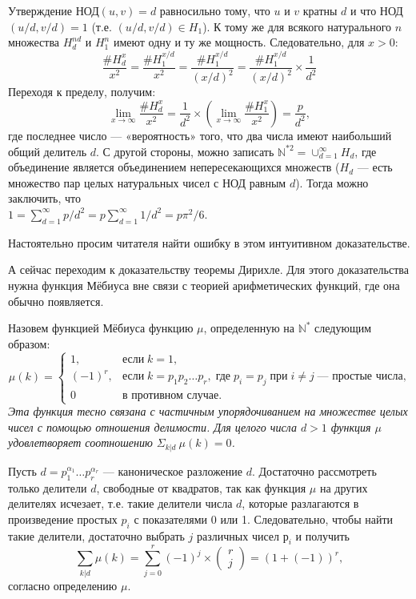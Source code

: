 \begin{myproof}
Утверждение НОД$(u,v) = d$ равносильно тому, что $u$ и $v$ кратны
$d$ и что НОД$(u/d,v/d) = 1$ (т.е. $(u/d,v/d)\in H_{1}$). К тому же для
всякого натурального $n$ множества $H_{d}^{nd}$ и  $H_{1}^n$ имеют одну и ту же
мощность. Следовательно, для $x > 0$:
$$\frac{\#H_{d}^x}{x^2}=\frac{\#H_{1}^{x/d}}{x^2}=\frac{\#H_{1}^{x/d}}{(x/d)^2}=\frac{\#H_{1}^{x/d}}{(x/d)^2}\times\frac{1}{d^2}$$
Переходя к пределу, получим:
$$\lim\limits_{x\to\infty}\frac{\#H_{d}^x}{x^2}=\frac{1}{d^2}\times\left(\lim\limits_{x\to\infty}\frac{\#H_{1}^x}{x^2} \right) = \frac{p}{d^2},$$
где последнее число — «вероятность» того, что два числа имеют
наибольший общий делитель $d$. С другой стороны, можно запи­сать $\mathbb{N}^{*2}=\cup_{d=1}^{\infty}H_{d}$, где
 объединение является объединением непересекающихся множеств ($H_{d}$ — есть множество пар целых натуральных чисел с НОД равным $d$). Тогда можно заключить, что\\
$1 =\sum\nolimits_{d=1}^{\infty} p/d^2 = p\sum\nolimits_{d=1}^{\infty}1/d^2=p\pi^2/6$.
\end{myproof}

Настоятельно просим читателя найти ошибку в этом интуитивном
доказательстве.

А сейчас переходим к доказательству теоремы Дирихле. Для этого
доказательства нужна функция Мёбиуса вне связи с теорией арифме­тических функций, где она обычно появляется.

\begin{property}
\hspace*{0.5cm}Назовем функцией Мёбиуса функцию $\mu$, определенную на $\mathbb{N}^{*}$ следу­ющим образом:
$$\mu(k)=
\left\lbrace
\begin{array}{ll}
1,&\text{если}\;k=1,\\
(-1)^r,&\text{если}\;k=p_{1}p_{2}\ldots p_{r},\;\text{где}\;p_{i}=p_{j}\;\text{при}\;i\neq j\;\text{— простые числа,}\\
0&\text{в противном случае.}
\end{array}
\right.$$
\textit{Эта функция тесно связана с частичным упорядочиванием на множе­стве целых чисел с помощью отношения делимости. Для целого числа
$d>1$ функция $\mu$ удовлетворяет соотношению $\Sigma_{k|d}\:\mu(k)=0$.}
\end{property}
\begin{myproof}
Пусть $d=p_{1}^{\alpha_{1}}\ldots p_{r}^{\alpha_{r}}$
 — каноническое разложение $d$. Достаточно
рассмотреть только делители $d$, свободные от квадратов, так как
функция $\mu$ на других делителях исчезает, т.е. такие делители числа
$d$, которые разлагаются в произведение простых $p_{i}$ с показателями
0 или 1. Следовательно, чтобы найти такие делители, достаточно
выбрать $j$ различных чисел $р_{i}$ и получить
$$\sum\limits_{k|d}\mu(k)=\sum\limits_{j=0}^r(-1)^j\times
\begin{pmatrix}
r\\
j
\end{pmatrix}
=(1+(-1))^r,$$
согласно определению $\mu$.
\end{myproof}

